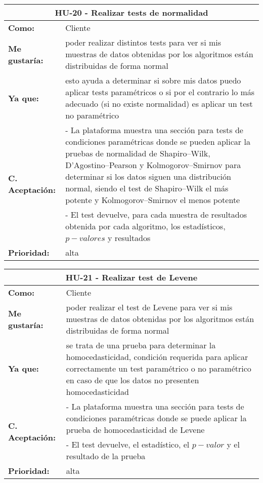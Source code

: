 \begin{table}[H]
	\begin{tabular}{| p{3cm}| p{11cm} |}
		\hline
		\multicolumn{2}{|c|}{\textbf{HU-20} - Realizar tests de normalidad} \\ \hline
		\textbf{Como:} & Cliente \\ \hline
		\textbf{Me gustaría:} & poder realizar distintos tests para ver si mis muestras de datos obtenidas por los algoritmos están distribuidas de forma normal \\ \hline
		\textbf{Ya que:} & esto ayuda a determinar si sobre mis datos puedo aplicar tests paramétricos o si por el contrario lo más adecuado (si no existe normalidad) es aplicar un test no paramétrico \\ \hline
		\multirow{2}{11cm}{\textbf{C. Aceptación:}} & - La plataforma muestra una sección para tests de condiciones paramétricas donde se pueden aplicar la pruebas de normalidad de Shapiro–Wilk, D’Agostino–Pearson y Kolmogorov–Smirnov para determinar si los datos siguen una distribución normal, siendo el test de Shapiro–Wilk el más potente y Kolmogorov–Smirnov el menos potente \\
		& - El test devuelve, para cada muestra de resultados obtenida por cada algoritmo, los estadísticos, $p-valores$ y resultados \\ \hline
		\textbf{\textbf{Prioridad:}} & alta \\ \hline
	\end{tabular}
\end{table}


\begin{table}[H]
	\begin{tabular}{| p{3cm}| p{11cm} |}
		\hline
		\multicolumn{2}{|c|}{\textbf{HU-21} - Realizar test de Levene} \\ \hline
		\textbf{Como:} & Cliente \\ \hline
		\textbf{Me gustaría:} & poder realizar el test de Levene para ver si mis muestras de datos obtenidas por
		los algoritmos están distribuidas de forma normal  \\ \hline
		\textbf{Ya que:} & se trata de una prueba para determinar la homocedasticidad, condición requerida para aplicar correctamente un test paramétrico o no paramétrico en caso de que los datos no presenten homocedasticidad \\ \hline
		\multirow{2}{11cm}{\textbf{C. Aceptación:}} & - La plataforma muestra una sección para tests de condiciones paramétricas donde se puede aplicar la prueba de homocedasticidad de Levene \\
		& - El test devuelve, el estadístico, el $p-valor$ y el resultado de la prueba \\ \hline
		\textbf{\textbf{Prioridad:}} & alta \\ \hline
	\end{tabular}
\end{table}

